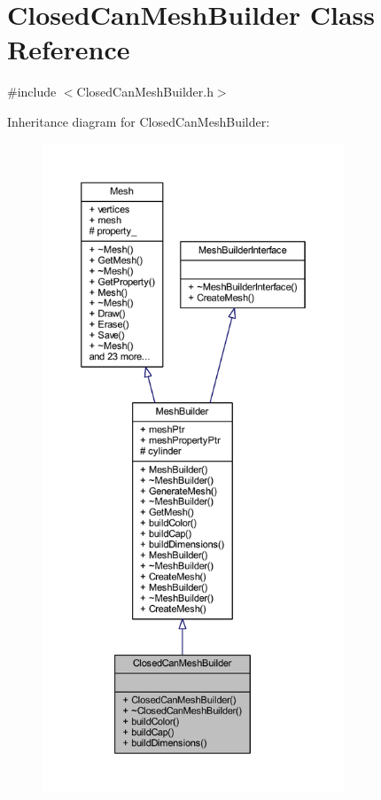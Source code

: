 \hypertarget{class_closed_can_mesh_builder}{}\section{Closed\+Can\+Mesh\+Builder Class Reference}
\label{class_closed_can_mesh_builder}


{\ttfamily \#include $<$Closed\+Can\+Mesh\+Builder.\+h$>$}



Inheritance diagram for Closed\+Can\+Mesh\+Builder\+:\nopagebreak
\begin{figure}[H]
\begin{center}
\leavevmode
\includegraphics[height=550pt]{class_closed_can_mesh_builder__inherit__graph}
\end{center}
\end{figure}



